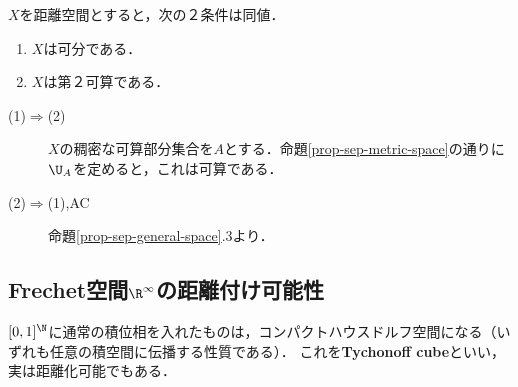 \documentclass[uplatex,dvipdfmx]{jsreport}
\begin{document}
\begin{corollary}\label{cor-separability-and-second-countability}
    $X$を距離空間とすると，次の２条件は同値．
    \begin{enumerate}
        \item $X$は可分である．
        \item $X$は第２可算である．
    \end{enumerate}
\end{corollary}
\begin{Proof}\mbox{}
    \begin{description}
        \item[(1)$\Rightarrow$(2)] $X$の稠密な可算部分集合を$A$とする．命題\ref{prop-sep-metric-space}の通りに$\U_A$を定めると，これは可算である．
        \item[(2)$\Rightarrow$(1),AC] 命題\ref{prop-sep-general-space}.3より．
    \end{description}
\end{Proof}

\subsection{Frechet空間$\R^\infty$の距離付け可能性}

\begin{tcolorbox}[colframe=ForestGreen, colback=ForestGreen!10!white,breakable,colbacktitle=ForestGreen!40!white,coltitle=black,fonttitle=\bfseries\sffamily,
title=]
    $[0,1]^\N$に通常の積位相を入れたものは，コンパクトハウスドルフ空間になる（いずれも任意の積空間に伝播する性質である）．
    これを\textbf{Tychonoff cube}といい，実は距離化可能でもある．
\end{tcolorbox}
\end{document}
